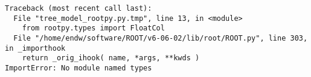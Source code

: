 \begin{footnotesize}
\begin{verbatim}
Traceback (most recent call last):
  File "tree_model_rootpy.py.tmp", line 13, in <module>
    from rootpy.types import FloatCol
  File "/home/endw/software/ROOT/v6-06-02/lib/root/ROOT.py", line 303, in _importhook
    return _orig_ihook( name, *args, **kwds )
ImportError: No module named types
\end{verbatim}
\end{footnotesize}

